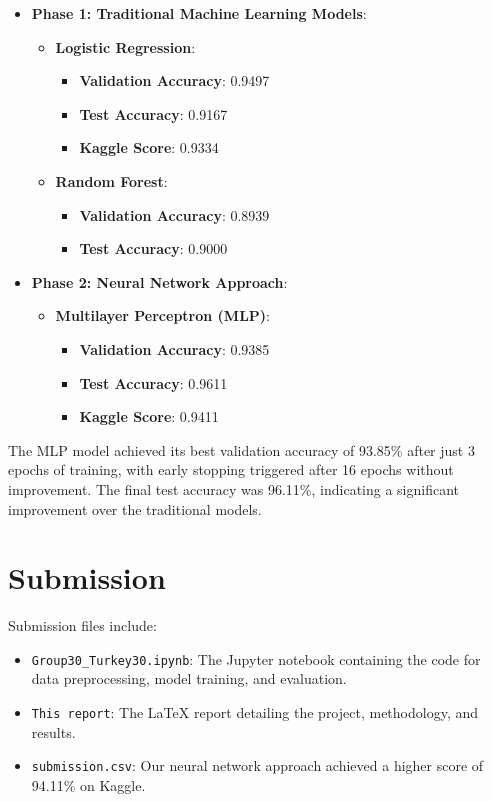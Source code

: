 \documentclass[12pt, a4paper]{article}
\begin{document}
\begin{itemize}
    \item \textbf{Phase 1: Traditional Machine Learning Models}:
        \begin{itemize}
            \item \textbf{Logistic Regression}:
                \begin{itemize}
                    \item \textbf{Validation Accuracy}: 0.9497
                    \item \textbf{Test Accuracy}: 0.9167
                    \item \textbf{Kaggle Score}: 0.9334
                \end{itemize}
            \item \textbf{Random Forest}:
                \begin{itemize}
                    \item \textbf{Validation Accuracy}: 0.8939
                    \item \textbf{Test Accuracy}: 0.9000
                \end{itemize}
        \end{itemize}
    \item \textbf{Phase 2: Neural Network Approach}:
        \begin{itemize}
            \item \textbf{Multilayer Perceptron (MLP)}:
                \begin{itemize}
                    \item \textbf{Validation Accuracy}: 0.9385
                    \item \textbf{Test Accuracy}: 0.9611
                    \item \textbf{Kaggle Score}: 0.9411
                \end{itemize}
        \end{itemize}
\end{itemize}

The MLP model achieved its best validation accuracy of 93.85\% after just 3 epochs of training, with early stopping triggered after 16 epochs without improvement. The final test accuracy was 96.11\%, indicating a significant improvement over the traditional models.

\section{Submission}
Submission files include:
\begin{itemize}
    \item \texttt{Group30\_Turkey30.ipynb}: The Jupyter notebook containing the code for data preprocessing, model training, and evaluation.
    \item \texttt{This report}: The LaTeX report detailing the project, methodology, and results.
    \item \texttt{submission.csv}: Our neural network approach achieved a higher score of 94.11\% on Kaggle.
\end{itemize}
\end{document}

